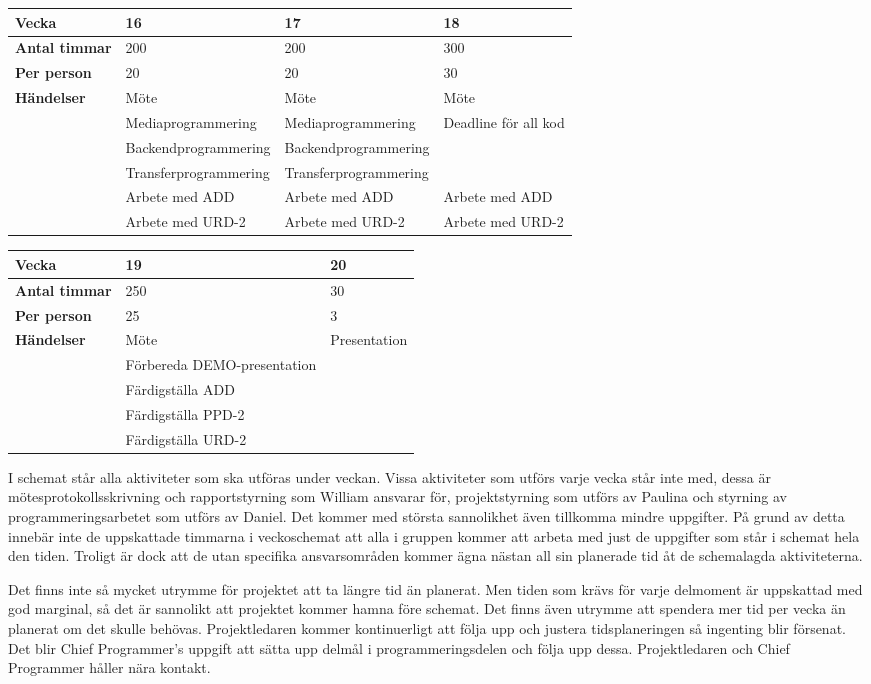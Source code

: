 \begin{tabular}{ | p{65pt} || p{110pt} | p{110pt} | p{110pt} |}
  \hline
  \textbf{Vecka} & 16 & 17 & 18  \\ \hline
  \textbf{Antal timmar} & 200 & 200 & 300 \\ \hline
  \textbf{Per person} & 20 & 20 & 30 \\ \hline
  \textbf{Händelser} & Möte & Möte & Möte \\ \hline
  & Mediaprogrammering & Mediaprogrammering & Deadline för all kod \\ \hline
  & Backendprogrammering & Backendprogrammering &  \\ \hline
  & Transferprogrammering & Transferprogrammering &  \\ \hline
  & Arbete med ADD & Arbete med ADD & Arbete med ADD \\ \hline
  & Arbete med URD-2 & Arbete med URD-2 & Arbete med URD-2\\ \hline
\end{tabular}

\begin{tabular}{ | p{65pt} || p{110pt} | p{233pt} |}
  \hline
  \textbf{Vecka} & 19 & 20 \\ \hline
  \textbf{Antal timmar} & 250 & 30 \\ \hline
  \textbf{Per person} & 25 & 3 \\ \hline
  \textbf{Händelser} & Möte & Presentation\\ \hline
  & Förbereda DEMO-presentation &\\ \hline
  & Färdigställa ADD &\\ \hline
  & Färdigställa PPD-2 &\\ \hline
  & Färdigställa URD-2 &\\ \hline
\end{tabular}

I schemat står alla aktiviteter som ska utföras under veckan. Vissa aktiviteter som utförs varje vecka står inte med, dessa är mötesprotokollsskrivning och rapportstyrning som William ansvarar för, projektstyrning som utförs av Paulina och styrning av programmeringsarbetet som utförs av Daniel. Det kommer med största sannolikhet även tillkomma mindre uppgifter. På grund av detta innebär inte de uppskattade timmarna i veckoschemat att alla i gruppen kommer att arbeta med just de uppgifter som står i schemat hela den tiden. Troligt är dock att de utan specifika ansvarsområden kommer ägna nästan all sin planerade tid åt de schemalagda aktiviteterna. 

Det finns inte så mycket utrymme för projektet att ta längre tid än planerat. Men tiden som krävs för varje delmoment är uppskattad med god marginal, så det är sannolikt att projektet kommer hamna före schemat. Det finns även utrymme att spendera mer tid per vecka än planerat om det skulle behövas. Projektledaren kommer kontinuerligt att följa upp och justera tidsplaneringen så ingenting blir försenat. Det blir Chief Programmer’s uppgift att sätta upp delmål i programmeringsdelen och följa upp dessa. Projektledaren och Chief Programmer håller nära kontakt.
